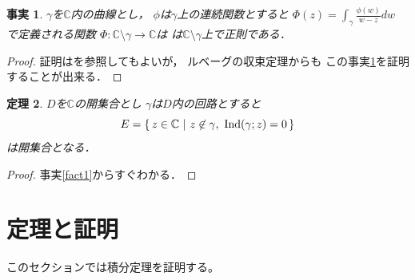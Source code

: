 \documentclass[leqno, 12pt, a4paper]{jsarticle}
\newtheorem{thm}{定理}
\newtheorem{fact}[thm]{事実}
\newcommand{\cc}{\mathbb{C}}
\newcommand{\ind}{\text{{\rm Ind}}}
\begin{document}
\begin{fact}\label{func}
$\gamma$を$\cc$内の曲線とし，
$\phi$は$\gamma$上の連続関数とすると
$\displaystyle \Phi(z)=\int_{\gamma}\frac{\phi(w)}{w-z}dw$
で定義される関数
$\Phi: \cc\setminus \gamma\to \cc$は
は$\cc \setminus \gamma$上で正則である．
\end{fact}
\begin{proof}
証明は\cite{1}を参照してもよいが，
ルベーグの収束定理からも
この事実\ref{func}を証明することが出来る．
\end{proof}
\begin{thm}
$D$を$\cc$の開集合とし
$\gamma$は$D$内の回路とすると
\[
E=\{\, z\in \cc \ |\ z\not\in \gamma,\ \ind(\gamma;z)=0 \, \}
\]
は開集合となる．
\end{thm}
\begin{proof}
事実\ref{fact1}からすぐわかる．
\end{proof}


\section{定理と証明}
このセクションでは積分定理を証明する。
\end{document}
